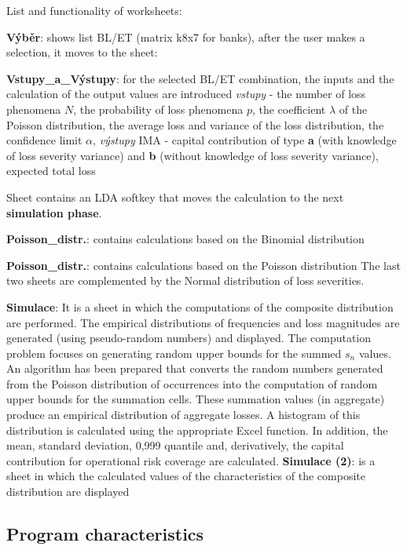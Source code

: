 \documentclass{article}
\begin{document}
List and functionality of worksheets:
\begin{compactitem}

\item \textbf{Výběr}: shows list BL/ET (matrix k8x7 for banks), after
  the user makes a selection, it moves to the sheet:
\item \textbf{Vstupy\_a\_Výstupy}: for the selected BL/ET combination, the inputs and the calculation of the output values are introduced
\emph{vstupy} - the number of loss phenomena $N$, the probability of loss phenomena $p$, the coefficient $\lambda$ of the Poisson distribution, the average loss and variance of the loss distribution, the confidence limit $\alpha$,
\emph{výstupy} IMA - capital contribution of type \textbf{a} (with knowledge of loss severity variance) and \textbf{b} (without knowledge of loss severity variance), expected total loss
  
Sheet contains an LDA softkey that moves the calculation to the next \textbf{simulation phase}.
\item \textbf{Poisson\_distr.}: contains calculations based on the Binomial distribution
\item \textbf{Poisson\_distr.}: contains calculations based on the Poisson distribution
The last two sheets are complemented by the Normal distribution of loss severities.
\item \textbf{Simulace}: It is a sheet in which the computations of the composite distribution are performed. The empirical distributions of frequencies and loss magnitudes are generated (using pseudo-random numbers) and displayed. The computation problem focuses on generating random upper bounds for the summed $s_n$ values. An algorithm has been prepared that converts the random numbers generated from the Poisson distribution of occurrences into the computation of random upper bounds for the summation cells. These summation values (in aggregate) produce an empirical distribution of aggregate losses. A histogram of this distribution is calculated using the appropriate Excel function. In addition, the mean, standard deviation, 0,999 quantile and, derivatively, the capital contribution for operational risk coverage are calculated.
\textbf{Simulace (2)}: is a sheet in which the calculated values of the characteristics of the composite distribution are displayed

\end{compactitem}

\subsection{Program characteristics}
\end{document}
